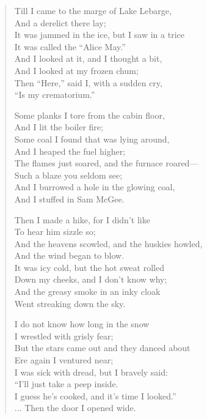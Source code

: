\begin{verse}
Till I came to the marge of Lake Lebarge,\\
\hspace*{2em}And a derelict there lay;\\
It was jammed in the ice, but I saw in a trice\\
\hspace*{2em}It was called the “Alice May.”\\
And I looked at it, and I thought a bit,\\
\hspace*{2em}And I looked at my frozen chum;\\
Then “Here,” said I, with a sudden cry,\\
\hspace*{2em}“Is my crematorium.”

Some planks I tore from the cabin floor,\\
\hspace*{2em}And I lit the boiler fire;\\
Some coal I found that was lying around,\\
\hspace*{3em}And I heaped the fuel higher;\\
The flames just soared, and the furnace roared—\\
\hspace*{2em}Such a blaze you seldom see;\\
And I burrowed a hole in the glowing coal,\\
\hspace*{2em}And I stuffed in Sam McGee.

Then I made a hike, for I didn’t like\\
\hspace*{2em}To hear him sizzle so;\\
And the heavens scowled, and the huskies howled,\\
\hspace*{2em}And the wind began to blow.\\
It was icy cold, but the hot sweat rolled\\
\hspace*{2em}Down my cheeks, and I don’t know why;\\
And the greasy smoke in an inky cloak\\
\hspace*{2em}Went streaking down the sky.

I do not know how long in the snow\\
\hspace*{2em}I wrestled with grisly fear;\\
But the stars came out and they danced about\\
\hspace*{2em}Ere again I ventured near;\\
I was sick with dread, but I bravely said:\\
\hspace*{2em}“I’ll just take a peep inside.\\
I guess he’s cooked, and it’s time I looked.”\\
\hspace*{2em}... Then the door I opened wide.


\end{verse}
